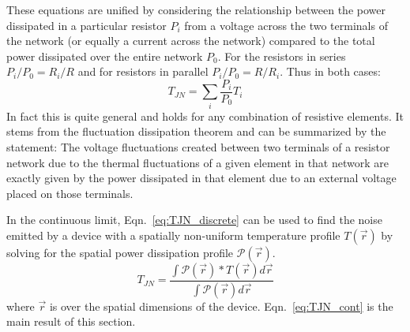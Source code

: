 These equations are unified by considering the relationship between the power dissipated in a particular resistor $P_i$ from a voltage across the two terminals of the network (or equally a current across the network) compared to the total power dissipated over the entire network $P_0$. For the resistors in series $P_i/P_0 = R_i/R$ and for resistors in parallel $P_i/P_0 = R/R_i$. Thus in both cases:
\begin{equation}\label{eq:TJN_discrete}
T_{JN} = \sum_i\frac{P_i}{P_0}T_i
\end{equation}
In fact this is quite general and holds for any combination of resistive elements. It stems from the fluctuation dissipation theorem and can be summarized by the statement: The voltage fluctuations created between two terminals of a resistor network due to the thermal fluctuations of a given element in that network are exactly given by the power dissipated in that element due to an external voltage placed on those terminals.

In the continuous limit, Eqn.~\ref{eq:TJN_discrete} can be used to find the noise emitted by a device with a spatially non-uniform temperature profile $T(\vec{r})$ by solving for the spatial power dissipation profile $\mathcal{P}(\vec{r})$.
\begin{equation}\label{eq:TJN_cont}
T_{JN} = \frac{\int \mathcal{P}(\vec{r})*T(\vec{r}) d\vec{r}}{\int \mathcal{P}(\vec{r}) d\vec{r}}
\end{equation}
where $\vec{r}$ is over the spatial dimensions of the device. Eqn.~\ref{eq:TJN_cont} is the main result of this section.


